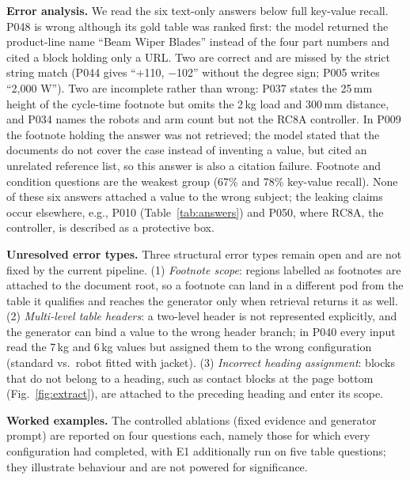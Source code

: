 \documentclass[runningheads]{llncs}
\begin{document}
\textbf{Error analysis.}\label{sec:errors} We read the six text-only answers below full key-value recall. P048 is wrong although its gold table was ranked first: the model returned the product-line name ``Beam Wiper Blades'' instead of the four part numbers and cited a block holding only a URL. Two are correct and are missed by the strict string match (P044 gives ``+110, $-$102'' without the degree sign; P005 writes ``2,000 W''). Two are incomplete rather than wrong: P037 states the 25\,mm height of the cycle-time footnote but omits the 2\,kg load and 300\,mm distance, and P034 names the robots and arm count but not the RC8A controller. In P009 the footnote holding the answer was not retrieved; the model stated that the documents do not cover the case instead of inventing a value, but cited an unrelated reference list, so this answer is also a citation failure. Footnote and condition questions are the weakest group (67\% and 78\% key-value recall). None of these six answers attached a value to the wrong subject; the leaking claims occur elsewhere, e.g., P010 (Table~\ref{tab:answers}) and P050, where RC8A, the controller, is described as a protective box.

\textbf{Unresolved error types.} Three structural error types remain open and are not fixed by the current pipeline. (1) \emph{Footnote scope}: regions labelled as footnotes are attached to the document root, so a footnote can land in a different pod from the table it qualifies and reaches the generator only when retrieval returns it as well. (2) \emph{Multi-level table headers}: a two-level header is not represented explicitly, and the generator can bind a value to the wrong header branch; in P040 every input read the 7\,kg and 6\,kg values but assigned them to the wrong configuration (standard vs.\ robot fitted with jacket). (3) \emph{Incorrect heading assignment}: blocks that do not belong to a heading, such as contact blocks at the page bottom (Fig.~\ref{fig:extract}), are attached to the preceding heading and enter its scope.

\textbf{Worked examples.} The controlled ablations (fixed evidence and generator prompt) are reported on four questions each, namely those for which every configuration had completed, with E1 additionally run on five table questions; they illustrate behaviour and are not powered for significance.
\end{document}
